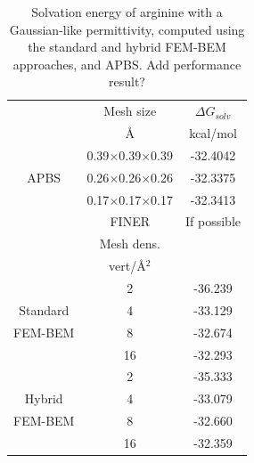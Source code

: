 \begin{table}
\centering
\begin{tabular}{c|c|c}
&Mesh size & $\Delta G_{solv}$\\
&\AA       &  kcal/mol \\
\hline
\multirow{3}{*}{APBS}& 0.39$\times$0.39$\times$0.39 & -32.4042\\ 
&0.26$\times$0.26$\times$0.26 & -32.3375\\ 
&0.17$\times$0.17$\times$0.17 & -32.3413\\ 
& FINER & If possible\\ 
\hline
&Mesh dens. & \\
&vert/\AA$^2$ & \\
\hline
    & 2 & -36.239\\
Standard    & 4  & -33.129 \\
FEM-BEM    & 8  & -32.674 \\
    & 16 & -32.293 \\
\hline
    & 2 & -35.333\\
Hybrid    & 4  & -33.079 \\
FEM-BEM    & 8  & -32.660 \\
    & 16 & -32.359 \\
\hline
\end{tabular}
\caption{Solvation energy of arginine with a Gaussian-like permittivity, computed using the standard and hybrid FEM-BEM approaches, and APBS. Add performance result?}
\label{table:arg_variable}
\end{table}

